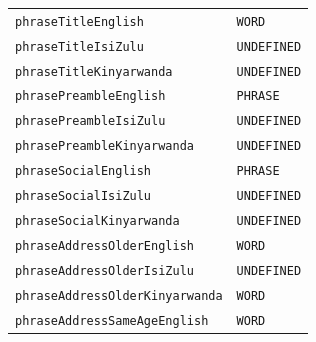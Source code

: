 \documentclass{CSSRforAfrica}
\begin{document}
\begin{table}[H]
\begin{tabular}{l l}
{\footnotesize \verb+phraseTitleEnglish+}                                         & {\footnotesize \verb+WORD+}\vspace{-1.5mm}  \\
{\footnotesize \verb+phraseTitleIsiZulu+}                                          & {\footnotesize \verb+UNDEFINED+}\vspace{-1.5mm}  \\
{\footnotesize \verb+phraseTitleKinyarwanda+}                                 & {\footnotesize \verb+UNDEFINED+}\vspace{-1.5mm}  \\
{\footnotesize \verb+phrasePreambleEnglish+}                                  & {\footnotesize \verb+PHRASE+}\vspace{-1.5mm} \\
{\footnotesize \verb+phrasePreambleIsiZulu+}                                   & {\footnotesize \verb+UNDEFINED+}\vspace{-1.5mm} \\
{\footnotesize \verb+phrasePreambleKinyarwanda+}                          & {\footnotesize \verb+UNDEFINED+}\vspace{-1.5mm} \\
{\footnotesize \verb+phraseSocialEnglish+}                                        & {\footnotesize \verb+PHRASE+}\vspace{-1.5mm} \\
{\footnotesize \verb+phraseSocialIsiZulu+}                                        & {\footnotesize \verb+UNDEFINED+}\vspace{-1.5mm} \\
{\footnotesize \verb+phraseSocialKinyarwanda+}                               & {\footnotesize \verb+UNDEFINED+}\vspace{-1.5mm} \\
{\footnotesize \verb+phraseAddressOlderEnglish+}                           & {\footnotesize \verb+WORD+ } \vspace{-1.5mm} \\
{\footnotesize \verb+phraseAddressOlderIsiZulu+}                            & {\footnotesize \verb+UNDEFINED+ } \vspace{-1.5mm} \\
{\footnotesize \verb+phraseAddressOlderKinyarwanda+}                   & {\footnotesize \verb+WORD+ } \vspace{-1.5mm} \\
{\footnotesize \verb+phraseAddressSameAgeEnglish+}                      & {\footnotesize \verb+WORD+} \vspace{-1.5mm}  \\

\end{tabular}
\end{table}
\end{document}
